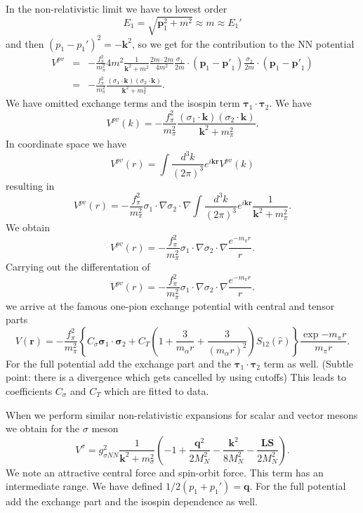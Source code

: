 \documentclass[graybox,sectrefs,envcountresetchap,open=right]{svmonodo}
\begin{document}
In the non-relativistic limit we have to lowest order 
\[
E_{1}=\sqrt{\mathbf{p}_{1}^{2}+m^{2}}\approx m \approx E_{1}'
\]
and then $(p_{1}-p_{1}')^{2}=-\mathbf{k}^{2}$, so we get 
for the contribution to the NN potential
\begin{eqnarray}
V^{pv}&=&-\frac{f_{\pi}^{2}}{m_{\pi}^{2}}4m^{2}\frac{1}{\mathbf{k}^{2}+m^{2}}
\frac{2m\cdot 2m}{4m^{2}}\frac{\sigma_{1}}{2m}\cdot(\mathbf{p}_{1}-\mathbf{p'}_{1})
\frac{\sigma_{2}}{2m}\cdot (\mathbf{p}_{1}-\mathbf{p'}_{1}) \nonumber \\ 
 &=&-\frac{f_{\pi}^{2}}{m_{\pi}^{2}}
\frac{(\sigma_{1}\cdot\mathbf{k})(\sigma_{2}\cdot\mathbf{k})}{\mathbf{k}^{2}+m_{\pi}^{2}}.
\nonumber
\end{eqnarray}
We have omitted exchange terms and the isospin term $\mathbf{\tau}_1\cdot\mathbf{\tau}_2$.
\noindent
We have
\[
V^{pv}(k)=-\frac{f_{\pi}^{2}}{m_{\pi}^{2}}
\frac{(\sigma_{1}\cdot\mathbf{k})(\sigma_{2}\cdot\mathbf{k})}{\mathbf{k}^{2}+m_{\pi}^{2}}.
\]
In coordinate space we have
\[
V^{pv}(r)=\int\frac{d^3k}{(2\pi)^3}e^{i\mathbf{kr}}V^{pv}(k)
\]
resulting in
\[
  V^{pv}(r)=-\frac{f_{\pi}^{2}}{m_{\pi}^{2}}
\sigma_{1}\cdot{\nabla}\sigma_{2}\cdot{\nabla}
\int\frac{d^3k}{(2\pi)^3}e^{i\mathbf{kr}}\frac{1}{\mathbf{k}^{2}+m_{\pi}^{2}}.
\]
We obtain
\[
V^{pv}(r)=-\frac{f_{\pi}^{2}}{m_{\pi}^{2}}\sigma_{1}\cdot{\nabla}\sigma_{2}\cdot{\nabla}\frac{e^{-m_{\pi}r}}{r}.
\]
Carrying out the differentation of
\[
V^{pv}(r)=-\frac{f_{\pi}^{2}}{m_{\pi}^{2}}\sigma_{1}\cdot{\nabla}\sigma_{2}\cdot{\nabla}\frac{e^{-m_{\pi}r}}{r}.
\]
we arrive at the famous one-pion exchange potential with central and tensor parts
\[
V(\mathbf{r})= -\frac{f_{\pi}^{2}}{m_{\pi}^{2}}\left\{C_{\sigma}\mathbf{\sigma}_1\cdot\mathbf{\sigma}_2+ C_T \left( 1 + \frac{3}{m_\alpha r} + \frac{3}{\left(m_\alpha r\right)^2}\right) S_{12}(\hat r)\right\}\frac{\exp{-m_\pi r}}{m_\pi r}.
\]
For the full potential add the exchange part and the $\mathbf{\tau}_1\cdot\mathbf{\tau}_2$ term as well. (Subtle point: there is a divergence which gets cancelled by using cutoffs) This leads to coefficients $C_{\sigma}$ and $C_T$ which are fitted to data.


When we perform similar non-relativistic expansions for scalar and vector mesons we obtain
for the $\sigma$ meson
\[
V^{\sigma}= g_{\sigma NN}^{2}\frac{1}{\mathbf{k}^{2}+m_{\sigma}^{2}}\left (-1+\frac{\mathbf{q}^{2}}{2M_N^2}
-\frac{\mathbf{k}^{2}}{8M_N^2}-\frac{\mathbf{LS}}{2M_N^2}\right).
\]
We note an attractive central force and spin-orbit force. This term has an intermediate range.
We have defined $1/2(p_{1}+p_{1}')=\mathbf{q}$.
For the full potential add the exchange part and the isospin dependence as well.
\end{document}
